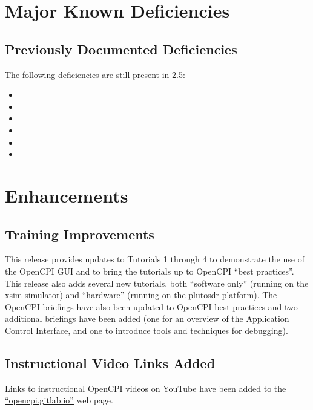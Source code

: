 \section{Major Known Deficiencies}
\label{sec:25_bugs}

\subsection{Previously Documented Deficiencies}
The following deficiencies are still present in 2.5:
\begin{itemize}
\setlength\itemsep{0em} %
\item {}
\item {}
\item {}
\item {}
\item {}
\item {}
\end{itemize}


\beginoldnotes
{}
\def\ocpiversion{v2.4.0}
\section{Enhancements}

\subsection{Training Improvements}
\label{sec:24_training}
This release provides updates to Tutorials 1 through 4 to demonstrate the use of the OpenCPI GUI and to bring the tutorials up to OpenCPI ``best practices''. This release also adds several new tutorials, both ``software only'' (running on the xsim simulator) and ``hardware'' (running on the plutosdr platform).  The OpenCPI briefings have also been updated to OpenCPI best practices and two additional briefings have been added (one for an overview of the Application Control Interface, and one to introduce tools and techniques for debugging).\\

\subsection{Instructional Video Links Added}
\label{sec:24_video_links}
Links to instructional OpenCPI videos on YouTube have been added to the \href{https://opencpi.gitlab.io}{``opencpi.gitlab.io''} web page.\\

